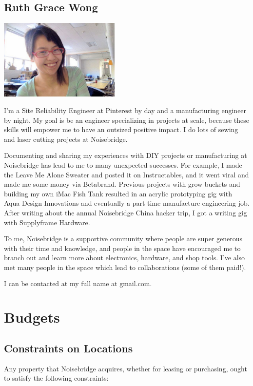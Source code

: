 \documentclass[12pt]{article}
\begin{document}
\subsection{Ruth Grace Wong}

\includegraphics[width=6cm]{ruth}

I'm a Site Reliability Engineer at Pinterest by day and a manufacturing engineer by night. My goal is be an engineer specializing in projects at scale, because these skills will empower me to have an outsized positive impact. I do lots of sewing and laser cutting projects at Noisebridge.

Documenting and sharing my experiences with DIY projects or manufacturing at Noisebridge has lead to me to many unexpected successes. For example, I made the Leave Me Alone Sweater and posted it on Instructables, and it went viral and made me some money via Betabrand. Previous projects with grow buckets and building my own iMac Fish Tank resulted in an acrylic prototyping gig with Aqua Design Innovations and eventually a part time manufacture engineering job. After writing about the annual Noisebridge China hacker trip, I got a writing gig with Supplyframe Hardware.

To me, Noisebridge is a supportive community where people are super generous with their time and knowledge, and people in the space have encouraged me to branch out and learn more about electronics, hardware, and shop tools. I've also met many people in the space which lead to collaborations (some of them paid!).

I can be contacted at my full name at gmail.com.

\section{Budgets}

\subsection{Constraints on Locations}

Any property that Noisebridge acquires, whether for leasing or purchasing, ought to satisfy the following constraints:
\end{document}
